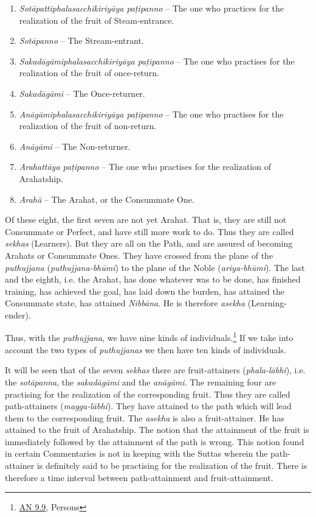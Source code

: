 \begin{enumerate}
\def\labelenumi{\arabic{enumi}.}
\item
  \textit{Sotāpattiphalasacchikiriyāya paṭipanno} -- The one who practices for the realization of the fruit of Steam-entrance.
\item
  \textit{Sotāpanno} -- The Stream-entrant.
\item
  \textit{Sakadāgāmiphalasacchikiriyāya paṭipanno} -- The one who practises for the realization of the fruit of once-return.
\item
  \textit{Sakadāgāmi} -- The Once-returner.
\item
  \textit{Anāgāmiphalasacchikiriyāya paṭipanno} -- The one who practises for the realization of the fruit of non-return.
\item
  \textit{Anāgāmi} -- The Non-returner.
\item
  \textit{Arahattāya paṭipanno} -- The one who practises for the realization of Arahatship.
\item
  \textit{Arahā} -- The Arahat, or the Consummate One.
\end{enumerate}

Of these eight, the first seven are not yet Arahat. That is, they are still not Consummate or Perfect, and have still more work to do. Thus they are called \textit{sekhas} (Learners). But they are all on the Path, and are assured of becoming Arahats or Consummate Ones. They have crossed from the plane of the \textit{puthujjana} (\textit{puthujjana-bhūmi}) to the plane of the Noble (\textit{ariya-bhūmi}). The last and the eighth, i.e. the Arahat, has done whatever was to be done, has finished training, has achieved the goal, has laid down the burden, has attained the Consummate state, has attained \textit{Nibbāna}. He is therefore \textit{asekha} (Learning-ender).

Thus, with the \textit{puthujjana}, we have nine kinds of individuals.\footnote{\href{https://suttacentral.net/an9.9/en/sujato}{AN 9.9}, Persons} If we take into account the two types of \textit{puthujjanas} we then have ten kinds of individuals.

It will be seen that of the seven \textit{sekhas} there are fruit-attainers (\textit{phala-lābhi}), i.e. the \textit{sotāpanna}, the \textit{sakadāgāmi} and the \textit{anāgāmi}. The remaining four are practising for the realization of the corresponding fruit. Thus they are called path-attainers (\textit{magga-lābhi}). They have attained to the path which will lead them to the corresponding fruit. The \textit{asekha} is also a fruit-attainer. He has attained to the fruit of Arahatship. The notion that the attainment of the fruit is immediately followed by the attainment of the path is wrong. This notion found in certain Commentaries is not in keeping with the Suttas wherein the path-attainer is definitely said to be practising for the realization of the fruit. There is therefore a time interval between path-attainment and fruit-attainment.

